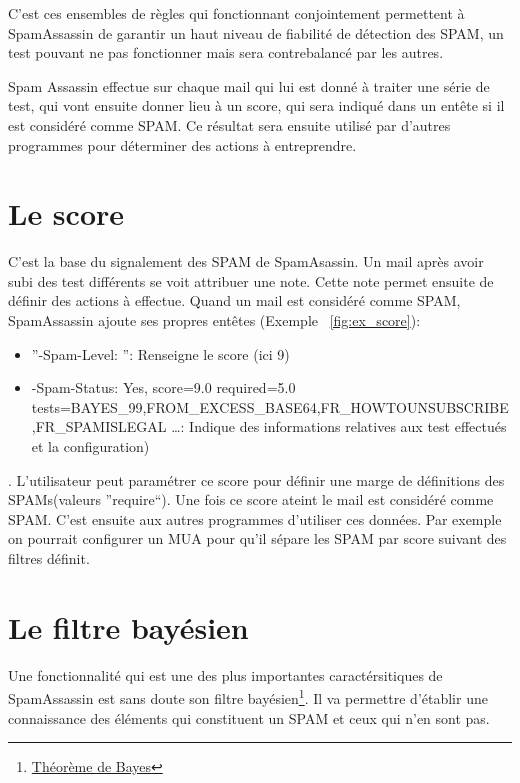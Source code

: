 \documentclass[a4paper,11pt]{article}
\begin{document}
\begin{description}
C'est ces ensembles de règles qui fonctionnant conjointement permettent à SpamAssassin de garantir un haut 
niveau de fiabilité de détection des SPAM, un test pouvant ne pas fonctionner mais sera contrebalancé par les autres.
 \end{description} 


Spam Assassin effectue sur chaque mail qui lui est donné à traiter une série de test, qui vont ensuite donner lieu à un score, qui sera indiqué dans un entête 
si il est considéré comme SPAM. 
Ce résultat sera ensuite utilisé par d'autres programmes pour déterminer des actions à entreprendre.


\section{Le score} \label{score}
C'est la base du signalement des SPAM de SpamAsassin. Un mail après avoir subi des test différents se voit attribuer une note. Cette note permet
ensuite de définir des actions à effectue. Quand un mail est considéré comme SPAM, SpamAssassin ajoute ses propres entêtes (Exemple ~\ref{fig:ex_score}):
\begin{itemize}
 \item ''-Spam-Level: \*\*\*\*\*\*\*\*\* '': Renseigne le score (ici 9)
 \item -Spam-Status: Yes, score=9.0 required=5.0 tests=BAYES\_99,FROM\_EXCESS\_BASE64,FR\_HOWTOUNSUBSCRIBE,FR\_SPAMISLEGAL \dots : Indique des informations relatives aux test effectués et la configuration)
\end{itemize}

. L'utilisateur peut paramétrer ce score pour définir une marge de définitions des SPAMs(valeurs ''require``). Une fois ce score ateint le mail est considéré comme SPAM.
C'est ensuite aux autres programmes d'utiliser ces données. Par exemple on pourrait configurer un MUA pour qu'il sépare 
les SPAM par score suivant des filtres définit. 

\label{baye}
\section{Le filtre bayésien}


Une fonctionnalité qui est une des plus importantes caractérsitiques de SpamAssassin est sans doute son filtre
bayésien\footnote{\href {https://fr.wikipedia.org/wiki/Th\%C3\%A9or\%C3\%A8me\_de_Bayes}{Théorème de Bayes}}.
Il va permettre d'établir une connaissance des éléments qui constituent un SPAM et ceux qui n'en sont pas.
\end{document}
